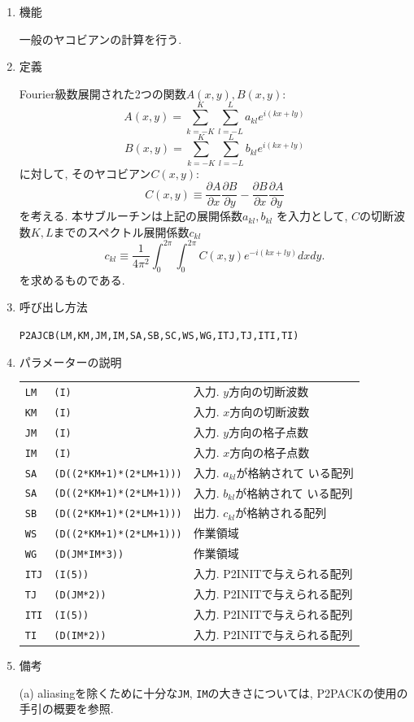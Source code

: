 \documentclass[a4j,fleqn]{jarticle}
\begin{document}
\begin{enumerate}

\item 機能 

一般のヤコビアンの計算を行う.

\item 定義

Fourier級数展開された2つの関数$A(x,y),B(x,y)$:
\[
A(x,y)=\sum^K_{k=-K}\sum^L_{l=-L}a_{kl}e^{i(kx+ly)}
\]
\[
B(x,y)=\sum^K_{k=-K}\sum^L_{l=-L}b_{kl}e^{i(kx+ly)}
\]
に対して, そのヤコビアン$C(x,y)$:
\[
C(x,y)\equiv
\frac{\partial A}{\partial x}\frac{\partial B}{\partial y}
-\frac{\partial B}{\partial x}\frac{\partial A}{\partial y}
\]
を考える. 本サブルーチンは上記の展開係数$a_{kl},b_{kl}$
を入力として,
$C$の切断波数$K,L$までのスペクトル展開係数$c_{kl}$
\begin{equation}
c_{kl}\equiv\frac1{4\pi^2}\int^{2\pi}_0\int^{2\pi}_0
C(x,y)e^{-i(kx+ly)}dxdy.
\end{equation}
を求めるものである. 

\item 呼び出し方法 

{\tt P2AJCB(LM,KM,JM,IM,SA,SB,SC,WS,WG,ITJ,TJ,ITI,TI)}
  
\item パラメーターの説明

\begin{tabular}{lll}
{\tt LM} & {\tt (I)} & 入力. $y$方向の切断波数\\
{\tt KM} & {\tt (I)} & 入力. $x$方向の切断波数\\
{\tt JM} & {\tt (I)} & 入力. $y$方向の格子点数\\
{\tt IM} & {\tt (I)} & 入力. $x$方向の格子点数\\
{\tt SA} & {\tt (D((2*KM+1)*(2*LM+1)))} & 入力. $a_{kl}$が格納されて
いる配列\\
{\tt SA} & {\tt (D((2*KM+1)*(2*LM+1)))} & 入力. $b_{kl}$が格納されて
いる配列\\
{\tt SB} & {\tt (D((2*KM+1)*(2*LM+1)))} & 出力. 
$c_{kl}$が格納される配列\\
{\tt WS} & {\tt (D((2*KM+1)*(2*LM+1)))} & 作業領域\\
{\tt WG} & {\tt (D(JM*IM*3))} & 作業領域\\
{\tt ITJ} & {\tt (I(5))} & 入力. P2INITで与えられる配列\\
{\tt TJ} & {\tt (D(JM*2))} & 入力. P2INITで与えられる配列\\
{\tt ITI} & {\tt (I(5))} & 入力. P2INITで与えられる配列\\
{\tt TI} & {\tt (D(IM*2))} & 入力. P2INITで与えられる配列
\end{tabular}

\item 備考

(a) aliasingを除くために十分な{\tt JM}, {\tt IM}の大きさについては,
P2PACKの使用の手引の概要を参照.

\end{enumerate}
\end{document}

